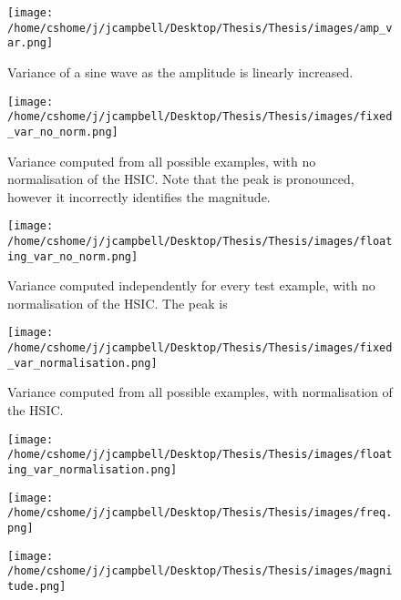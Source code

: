 \begin{figure}[h]
\texttt{[image: /home/cshome/j/jcampbell/Desktop/Thesis/Thesis/images/amp\_var.png]}
\caption{Variance of a sine wave as the amplitude is linearly increased.\label{amp_var}}
\end{figure}

\begin{figure}[h]
\texttt{[image: /home/cshome/j/jcampbell/Desktop/Thesis/Thesis/images/fixed\_var\_no\_norm.png]}
\caption{Variance computed from all possible examples, with no normalisation of the HSIC. Note that the peak is pronounced, however it incorrectly identifies the magnitude. \label{fixed_var_no_norm}}
\end{figure}

\begin{figure}[h]
\texttt{[image: /home/cshome/j/jcampbell/Desktop/Thesis/Thesis/images/floating\_var\_no\_norm.png]}
\caption{Variance computed independently for every test example, with no normalisation of the HSIC. The peak is\label{floating_var_no_norm}}
\end{figure}

\begin{figure}[h]
\texttt{[image: /home/cshome/j/jcampbell/Desktop/Thesis/Thesis/images/fixed\_var\_normalisation.png]}
\caption{Variance computed from all possible examples, with normalisation of the HSIC.\label{fixed_var_normalisation}}
\end{figure}

\begin{figure}[h]
\texttt{[image: /home/cshome/j/jcampbell/Desktop/Thesis/Thesis/images/floating\_var\_normalisation.png]}
\caption{\label{floating_var_normalisation}}
\end{figure}

\begin{figure}[h]
\texttt{[image: /home/cshome/j/jcampbell/Desktop/Thesis/Thesis/images/freq.png]}
\caption{\label{freq}}
\end{figure}

\begin{figure}[h]
\texttt{[image: /home/cshome/j/jcampbell/Desktop/Thesis/Thesis/images/magnitude.png]}
\caption{\label{magnitude}}
\end{figure}































